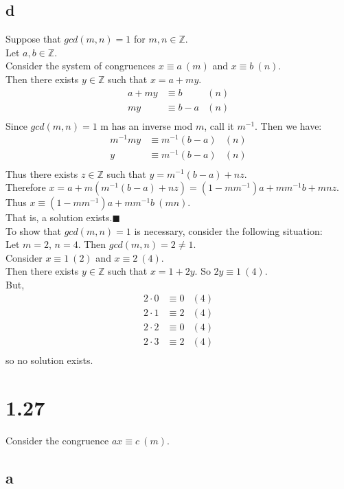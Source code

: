 \documentclass[letterpaper,12pt,oneside,onecolumn]{report}
\begin{document}
\subsection*{d}
Suppose that $gcd(m,n) = 1$ for $m,n \in \mathbb{Z}$.\\
Let $a,b \in \mathbb{Z}$.\\
Consider the system of congruences $x \equiv a\ (m)$ and $x \equiv b\ (n)$.\\
Then there exists $y \in \mathbb{Z}$ such that $x = a + my$.\\
\begin{align*}
a + my &\equiv  b &(n)\\
my &\equiv b-a &(n)\\
\end{align*}
Since $gcd(m,n) = 1$ m has an inverse mod $m$, call it $m^{-1}$.
Then we have:
\begin{align*}
m^{-1}my &\equiv m^{-1}(b-a) &(n)\\
y &\equiv m^{-1}(b-a) &(n)\\
\end{align*}
Thus there exists $z \in \mathbb{Z}$ such that $y = m^{-1}(b-a) + nz$.\\
Therefore $x = a + m(m^{-1}(b-a) + nz) = (1-mm^{-1})a + mm^{-1}b + mnz$.\\
Thus $x \equiv (1-mm^{-1})a + mm^{-1}b\ (mn)$.\\
That is, a solution exists.$\blacksquare$\\
To show that $gcd(m,n)=1$ is necessary, consider the following situation:\\
Let $m=2$, $n=4$. Then $gcd(m,n) = 2 \neq 1$.\\
Consider $x\equiv1\ (2)$ and $x\equiv2\ (4)$.\\
Then there exists $y \in \mathbb{Z}$ such that $x = 1 + 2y$.
So $2y \equiv 1\ (4)$.\\
But,
\begin{align*}
2\cdot0 &\equiv 0 &(4)\\
2\cdot1 &\equiv 2 &(4)\\
2\cdot2 &\equiv 0 &(4)\\
2\cdot3 &\equiv 2 &(4)\\ 
\end{align*}
so no solution exists. 
\section*{1.27}
Consider the congruence $ax \equiv c\ (m)$.
\subsection*{a}
\end{document}
